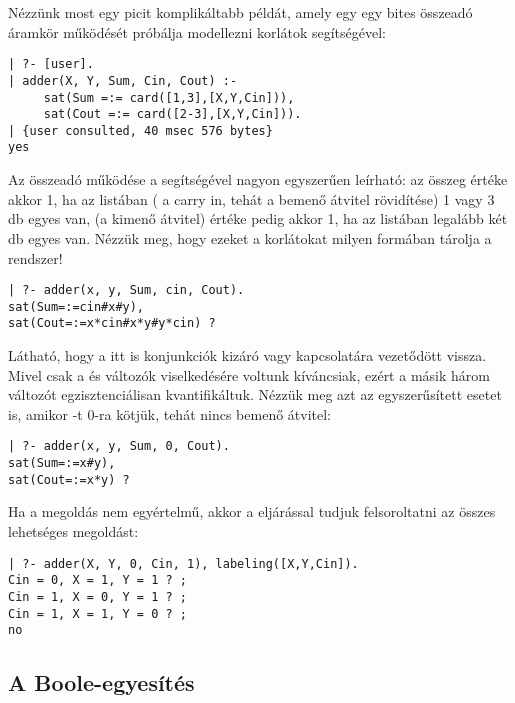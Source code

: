 Nézzünk most egy picit komplikáltabb \clpb példát, amely egy egy bites
összeadó áramkör működését próbálja modellezni \clpb korlátok segítségével:

\begin{verbatim}
| ?- [user].
| adder(X, Y, Sum, Cin, Cout) :-
     sat(Sum =:= card([1,3],[X,Y,Cin])),
     sat(Cout =:= card([2-3],[X,Y,Cin])).
| {user consulted, 40 msec 576 bytes}
yes
\end{verbatim}

Az összeadó működése a  segítségével nagyon egyszerűen leírható:
az összeg értéke akkor 1, ha az \cd{[X,Y,Cin]} listában ( a carry in,
tehát a bemenő átvitel rövidítése) 1 vagy 3 db egyes van, 
(a kimenő átvitel) értéke pedig akkor 1, ha az \cd{[X,Y,Cin]} listában legalább
két db egyes van. Nézzük meg, hogy ezeket a korlátokat milyen formában tárolja
a \clpb rendszer!

\begin{verbatim}
| ?- adder(x, y, Sum, cin, Cout).
sat(Sum=:=cin#x#y),
sat(Cout=:=x*cin#x*y#y*cin) ?
\end{verbatim}

Látható, hogy a  itt is konjunkciók kizáró vagy kapcsolatára
vezetődött vissza. Mivel csak a  és  változók viselkedésére
voltunk kíváncsiak, ezért a másik három változót egzisztenciálisan
kvantifikáltuk. Nézzük meg azt az egyszerűsített esetet is, amikor -t
0-ra kötjük, tehát nincs bemenő átvitel:

\begin{verbatim}
| ?- adder(x, y, Sum, 0, Cout).
sat(Sum=:=x#y),
sat(Cout=:=x*y) ?
\end{verbatim}

Ha a megoldás nem egyértelmű, akkor a  eljárással tudjuk
felsoroltatni az összes lehetséges megoldást:

\begin{verbatim}
| ?- adder(X, Y, 0, Cin, 1), labeling([X,Y,Cin]).
Cin = 0, X = 1, Y = 1 ? ; 
Cin = 1, X = 0, Y = 1 ? ;
Cin = 1, X = 1, Y = 0 ? ;
no
\end{verbatim}

\subsection{A Boole-egyesítés}

